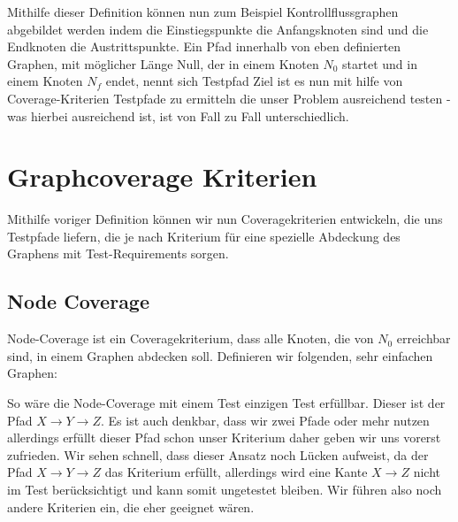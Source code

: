 Mithilfe dieser Definition können nun zum Beispiel Kontrollflussgraphen abgebildet werden indem die Einstiegspunkte die Anfangsknoten sind und die Endknoten die Austrittspunkte.
Ein Pfad innerhalb von eben definierten Graphen, mit möglicher Länge Null, der in einem Knoten $N_{0}$ startet und in einem Knoten $N_{f}$ endet, nennt sich Testpfad \cite[vgl. S. 28]{software-testing}
Ziel ist es nun mit hilfe von Coverage-Kriterien Testpfade zu ermitteln die unser Problem ausreichend testen - was hierbei ausreichend ist, ist von Fall zu Fall unterschiedlich.

\section{Graphcoverage Kriterien}

Mithilfe voriger Definition können wir nun Coveragekriterien entwickeln, die uns Testpfade liefern, die je nach Kriterium für eine spezielle Abdeckung
des Graphens mit Test-Requirements sorgen.

\subsection{Node Coverage}

Node-Coverage ist ein Coveragekriterium, dass alle Knoten, die von $N_{0}$ erreichbar sind, in einem Graphen abdecken soll.
Definieren wir folgenden, sehr einfachen Graphen:


So wäre die Node-Coverage mit einem Test einzigen Test erfüllbar.
Dieser ist der Pfad $X \rightarrow Y \rightarrow Z$.
Es ist auch denkbar, dass wir zwei Pfade oder mehr nutzen allerdings erfüllt dieser Pfad schon unser Kriterium daher geben wir uns vorerst zufrieden.
Wir sehen schnell, dass dieser Ansatz noch Lücken aufweist, da der Pfad $X \rightarrow Y \rightarrow Z$ das Kriterium erfüllt, allerdings wird eine Kante $X \rightarrow Z$ nicht im
Test berücksichtigt und kann somit ungetestet bleiben.
Wir führen also noch andere Kriterien ein, die eher geeignet wären.

